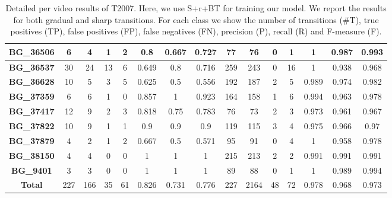 \documentclass[journal]{IEEEtran}
\begin{document}
\begin{table*}[h]
\begin{tabular}{|c|c|c|c|c|c|c|c|c|c|c|c|c|c|c|}
\textbf{BG\_36506} & 6             & 4           & 1           & 2           & 0.8        & 0.667      & 0.727      & 77            & 76          & 0           & 1           & 1          & 0.987      & 0.993      \\ \hline
\textbf{BG\_36537} & 30            & 24          & 13          & 6           & 0.649      & 0.8        & 0.716      & 259           & 243         & 0           & 16          & 1          & 0.938      & 0.968      \\ \hline
\textbf{BG\_36628} & 10            & 5           & 3           & 5           & 0.625      & 0.5        & 0.556      & 192           & 187         & 2           & 5           & 0.989      & 0.974      & 0.982      \\ \hline
\textbf{BG\_37359} & 6             & 6           & 1           & 0           & 0.857      & 1          & 0.923      & 164           & 158         & 1           & 6           & 0.994      & 0.963      & 0.978      \\ \hline
\textbf{BG\_37417} & 12            & 9           & 2           & 3           & 0.818      & 0.75       & 0.783      & 76            & 73          & 2           & 3           & 0.973      & 0.961      & 0.967      \\ \hline
\textbf{BG\_37822} & 10            & 9           & 1           & 1           & 0.9        & 0.9        & 0.9        & 119           & 115         & 3           & 4           & 0.975      & 0.966      & 0.97       \\ \hline
\textbf{BG\_37879} & 4             & 2           & 1           & 2           & 0.667      & 0.5        & 0.571      & 95            & 91          & 0           & 4           & 1          & 0.958      & 0.978      \\ \hline
\textbf{BG\_38150} & 4             & 4           & 0           & 0           & 1          & 1          & 1          & 215           & 213         & 2           & 2           & 0.991      & 0.991      & 0.991      \\ \hline
\textbf{BG\_9401}  & 3             & 3           & 0           & 0           & 1          & 1          & 1          & 89            & 88          & 0           & 1           & 1          & 0.989      & 0.994      \\ \hline
\textbf{Total}      & 227           & 166         & 35          & 61          & 0.826      & 0.731      & 0.776      & 227           & 2164        & 48          & 72          & 0.978      & 0.968      & 0.973      \\ \hline
\end{tabular}
\caption{Detailed per video results of T2007. Here, we use S+r+BT for training our model. We report the results for both gradual and sharp transitions. For each class we show the number of transitions (\#T), true positives (TP), false positives (FP), false negatives (FN), precision (P), recall (R) and F-measure (F).}
\label{2007_06}
\end{table*}
\end{document}
